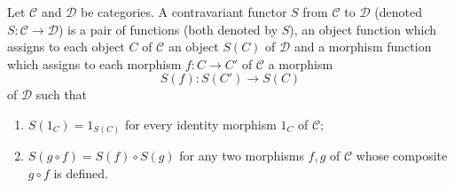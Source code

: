 Let $\mathcal{C}$ and $\mathcal{D}$ be categories. A contravariant functor $S$ from $\mathcal{C}$ to $\mathcal{D}$ (denoted $S : \mathcal{C} \to \mathcal{D}$) is a pair of functions (both denoted by $S$), an object function which assigns to each object $C$ of $\mathcal{C}$ an object $S(C)$ of $\mathcal{D}$ and a morphism function which assigns to each morphism $f : C \to C'$ of $\mathcal{C}$ a morphism
\[
S(f) : S(C') \to S(C)
\]
of $\mathcal{D}$ such that
\begin{enumerate}
\item[(i)] $S(1_C) = 1_{S(C)}$ for every identity morphism $1_C$ of $\mathcal{C}$;
\item[(ii)] $S(g \circ f) = S(f) \circ S(g)$ for any two morphisms $f, g$ of $\mathcal{C}$ whose composite $g \circ f$ is defined.
\end{enumerate}
